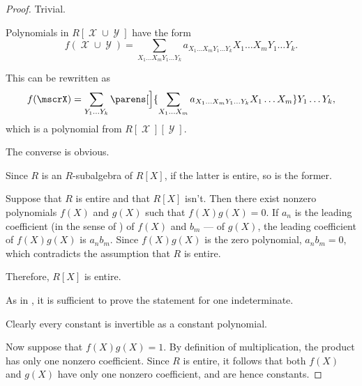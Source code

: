 \begin{proof}
   Trivial.

   Polynomials in \( R[\mscrX \cup \mscrY] \) have the form
  \begin{equation*}
    f(\mscrX \cup \mscrY) = \sum_{X_1 \ldots X_m Y_1 \ldots Y_k} a_{X_1 \ldots X_m Y_1 \ldots Y_k} X_1 \ldots X_m Y_1 \ldots Y_k.
  \end{equation*}

  This can be rewritten as
  \begin{equation*}
    f(\mscrX) = \sum_{Y_1 \ldots Y_k} \parens[\Big]{ \sum_{X_1 \ldots X_m} a_{X_1 \ldots X_m Y_1 \ldots Y_k} X_1 \ldots X_m } Y_1 \ldots Y_k,
  \end{equation*}
  which is a polynomial from \( R[\mscrX][\mscrY] \).

  The converse is obvious.


  \SufficiencySubProof Since \( R \) is an \( R \)-subalgebra of \( R[X] \), if the latter is entire, so is the former.

  \NecessitySubProof Suppose that \( R \) is entire and that \( R[X] \) isn't. Then there exist nonzero polynomials \( f(X) \) and \( g(X) \) such that \( f(X) g(X) = 0 \). If \( a_n \) is the leading coefficient (in the sense of ) of \( f(X) \) and \( b_m \) --- of \( g(X) \), the leading coefficient of \( f(X) g(X) \) is \( a_n b_m \). Since \( f(X) g(X) \) is the zero polynomial, \( a_n b_m = 0 \), which contradicts the assumption that \( R \) is entire.

  Therefore, \( R[X] \) is entire.

   As in , it is sufficient to prove the statement for one indeterminate.

  Clearly every constant is invertible as a constant polynomial.

  Now suppose that \( f(X) g(X) = 1 \). By definition of multiplication, the product has only one nonzero coefficient. Since \( R \) is entire, it follows that both \( f(X) \) and \( g(X) \) have only one nonzero coefficient, and are hence constants.
\end{proof}

